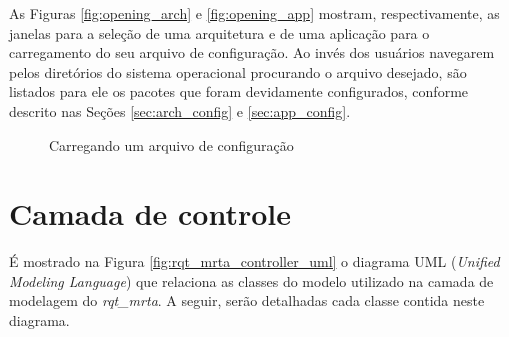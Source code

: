         As Figuras \ref{fig:opening_arch} e \ref{fig:opening_app} mostram, respectivamente, as janelas para a seleção de uma arquitetura e de uma aplicação para o carregamento do seu arquivo de configuração. Ao invés dos usuários navegarem pelos diretórios do sistema operacional procurando o arquivo desejado, são listados para ele os pacotes que foram devidamente configurados, conforme descrito nas Seções \ref{sec:arch_config} e \ref{sec:app_config}.
        
        \begin{figure}[htb]
            \centering
            \caption{Carregando um arquivo de configuração} \label{fig:opening_config}
        \end{figure}
        
    \section{Camada de controle} \label{subset:rqt_mrta_controller}
        É mostrado na Figura \ref{fig:rqt_mrta_controller_uml} o diagrama UML (\textit{Unified Modeling Language}) que relaciona as classes do modelo utilizado na camada de modelagem do \textit{rqt\_mrta}. A seguir, serão detalhadas cada classe contida neste diagrama.
        

